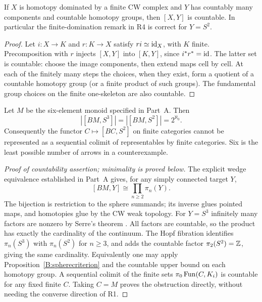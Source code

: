 \begin{proposition}
\label{B:finitedomination}
If $X$ is homotopy dominated by a finite CW complex and $Y$ has
countably many components and countable homotopy groups, then
$[X,Y]$ is countable. In particular the finite-domination remark in R4
is correct for $Y=S^2$.
\end{proposition}
\begin{proof}
Let $i:X\to K$ and $r:K\to X$ satisfy $ri\simeq\mathrm{id}_X$, with
$K$ finite. Precomposition with $r$ injects $[X,Y]$ into $[K,Y]$,
since $i^*r^*=\mathrm{id}$. The latter set is countable: choose the image
components, then extend maps cell by cell. At each of the finitely many
steps the choices, when they exist, form a quotient of a countable
homotopy group (or a finite product of such groups). The fundamental
group choices on the finite one-skeleton are also countable.
\end{proof}

\begin{theorem}
\label{B:main}
Let $M$ be the six-element monoid specified in Part~A. Then
\[
 |[BM,S^3]|=|[BM,S^2]|=2^{\aleph_0}.
\]
Consequently the functor $C\mapsto[BC,S^2]$ on finite categories
cannot be represented as a sequential colimit of representables by
finite categories. Six is the least possible number of arrows in a
counterexample.
\end{theorem}
\begin{proof}[Proof of countability assertion; minimality is proved below]
The explicit wedge equivalence established in Part~A gives, for any
simply connected target $Y$,
\[
 [BM,Y]\cong\prod_{n\geq2}\pi_n(Y).
\]
The bijection is restriction to the sphere summands; its inverse glues
pointed maps, and homotopies glue by the CW weak topology.
For $Y=S^3$ infinitely many factors are nonzero by Serre's theorem
\cite[Theorem~10 and the sphere corollary, pp.~217--219]{CDSerre1953}.
All factors are countable, so the product has exactly
the cardinality of the continuum. The Hopf fibration identifies
$\pi_n(S^3)$ with $\pi_n(S^2)$ for $n\geq3$, and adds the
countable factor $\pi_2(S^2)=\mathbb Z$, giving the same cardinality.
Equivalently one may apply Proposition~\ref{B:spherecriterion} and the countable upper bound
on each homotopy group. A sequential colimit of the finite sets
$\pi_0\operatorname{Fun}(C,K_i)$ is countable for any fixed finite $C$.
Taking $C=M$ proves the obstruction directly, without needing the
converse direction of R1.
\end{proof}

